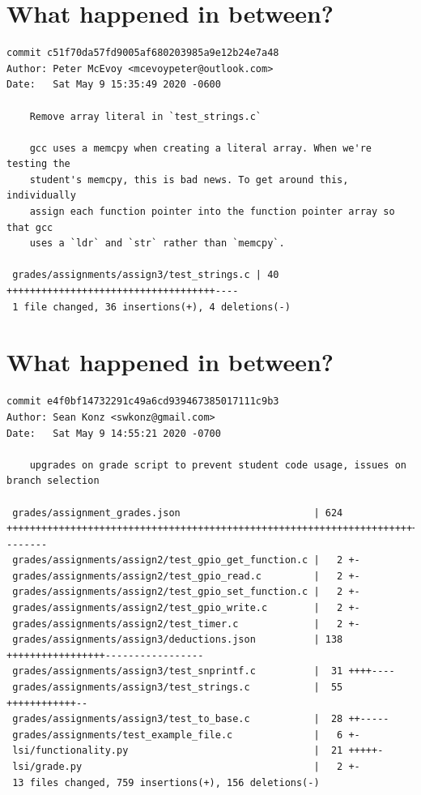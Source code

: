 \documentclass{article}
\begin{document}
\newpage

\section*{What happened in between?}
\vspace{2ex}
\begin{verbatim}
commit c51f70da57fd9005af680203985a9e12b24e7a48
Author: Peter McEvoy <mcevoypeter@outlook.com>
Date:   Sat May 9 15:35:49 2020 -0600

    Remove array literal in `test_strings.c`
    
    gcc uses a memcpy when creating a literal array. When we're testing the
    student's memcpy, this is bad news. To get around this, individually
    assign each function pointer into the function pointer array so that gcc
    uses a `ldr` and `str` rather than `memcpy`.

 grades/assignments/assign3/test_strings.c | 40 ++++++++++++++++++++++++++++++++++++----
 1 file changed, 36 insertions(+), 4 deletions(-)

\end{verbatim}

\newpage

\section*{What happened in between?}
\vspace{2ex}
\begin{verbatim}
commit e4f0bf14732291c49a6cd939467385017111c9b3
Author: Sean Konz <swkonz@gmail.com>
Date:   Sat May 9 14:55:21 2020 -0700

    upgrades on grade script to prevent student code usage, issues on branch selection

 grades/assignment_grades.json                       | 624 ++++++++++++++++++++++++++++++++++++++++++++++++++++++++++++++++++++++++++++++++++++++++++++++++++++++++++++++++++++++++++++++++++++++++++++++++--------
 grades/assignments/assign2/test_gpio_get_function.c |   2 +-
 grades/assignments/assign2/test_gpio_read.c         |   2 +-
 grades/assignments/assign2/test_gpio_set_function.c |   2 +-
 grades/assignments/assign2/test_gpio_write.c        |   2 +-
 grades/assignments/assign2/test_timer.c             |   2 +-
 grades/assignments/assign3/deductions.json          | 138 +++++++++++++++++-----------------
 grades/assignments/assign3/test_snprintf.c          |  31 ++++----
 grades/assignments/assign3/test_strings.c           |  55 ++++++++++++--
 grades/assignments/assign3/test_to_base.c           |  28 ++-----
 grades/assignments/test_example_file.c              |   6 +-
 lsi/functionality.py                                |  21 +++++-
 lsi/grade.py                                        |   2 +-
 13 files changed, 759 insertions(+), 156 deletions(-)
\end{verbatim}
\end{document}
